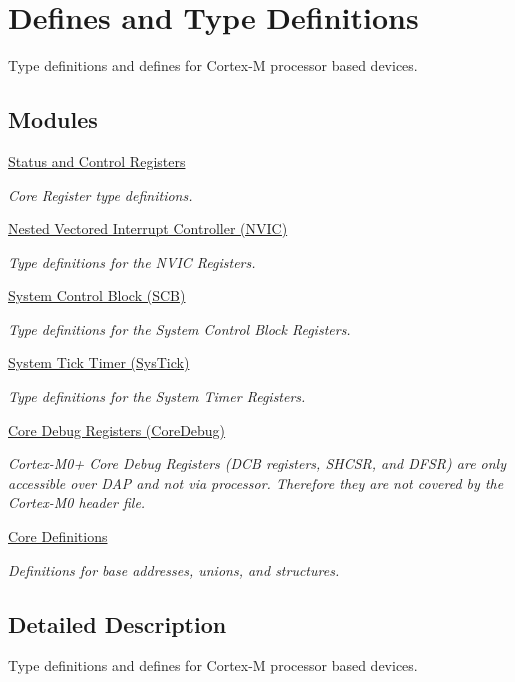 \hypertarget{group___c_m_s_i_s__core__register}{}\section{Defines and Type Definitions}
\label{group___c_m_s_i_s__core__register}


Type definitions and defines for Cortex-\/\+M processor based devices.  


\subsection*{Modules}
\begin{DoxyCompactItemize}
\item 
\hyperlink{group___c_m_s_i_s___c_o_r_e}{Status and Control Registers}
\begin{DoxyCompactList}\small\item\em Core Register type definitions. \end{DoxyCompactList}\item 
\hyperlink{group___c_m_s_i_s___n_v_i_c}{Nested Vectored Interrupt Controller (\+N\+V\+I\+C)}
\begin{DoxyCompactList}\small\item\em Type definitions for the N\+V\+I\+C Registers. \end{DoxyCompactList}\item 
\hyperlink{group___c_m_s_i_s___s_c_b}{System Control Block (\+S\+C\+B)}
\begin{DoxyCompactList}\small\item\em Type definitions for the System Control Block Registers. \end{DoxyCompactList}\item 
\hyperlink{group___c_m_s_i_s___sys_tick}{System Tick Timer (\+Sys\+Tick)}
\begin{DoxyCompactList}\small\item\em Type definitions for the System Timer Registers. \end{DoxyCompactList}\item 
\hyperlink{group___c_m_s_i_s___core_debug}{Core Debug Registers (\+Core\+Debug)}
\begin{DoxyCompactList}\small\item\em Cortex-\/\+M0+ Core Debug Registers (D\+C\+B registers, S\+H\+C\+S\+R, and D\+F\+S\+R) are only accessible over D\+A\+P and not via processor. Therefore they are not covered by the Cortex-\/\+M0 header file. \end{DoxyCompactList}\item 
\hyperlink{group___c_m_s_i_s__core__base}{Core Definitions}
\begin{DoxyCompactList}\small\item\em Definitions for base addresses, unions, and structures. \end{DoxyCompactList}\end{DoxyCompactItemize}


\subsection{Detailed Description}
Type definitions and defines for Cortex-\/\+M processor based devices. 

